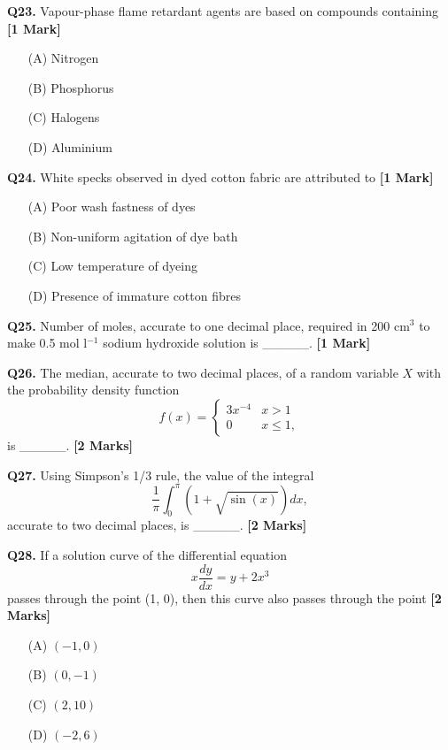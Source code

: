 \documentclass[11pt]{article}
\newcommand{\questiona}[2]{
    \noindent\textbf{Q#2.} #1 \hfill \textbf{[1 Mark]}
}
\newcommand{\questionb}[2]{
    \noindent\textbf{Q#2.} #1 \hfill \textbf{[2 Marks]}
}
\begin{document}
\questiona{Vapour-phase flame retardant agents are based on compounds containing}{23}
\begin{enumerate}
    \item[(A)] Nitrogen  
    \item[(B)] Phosphorus  
    \item[(C)] Halogens  
    \item[(D)] Aluminium  
\end{enumerate}
\vspace{0.5cm}

\questiona{White specks observed in dyed cotton fabric are attributed to}{24}
\begin{enumerate}
    \item[(A)] Poor wash fastness of dyes  
    \item[(B)] Non-uniform agitation of dye bath  
    \item[(C)] Low temperature of dyeing  
    \item[(D)] Presence of immature cotton fibres  
\end{enumerate}
\vspace{0.5cm}

\questiona{Number of moles, accurate to one decimal place, required in 200 cm\(^3\) to make 0.5 mol l\(^{-1}\) sodium hydroxide solution is \_\_\_\_\_.}{25}
\vspace{0.5cm}

\questionb{The median, accurate to two decimal places, of a random variable \( X \) with the probability density function
\[f(x) = 
\begin{cases} 
3x^{-4} & x > 1 \\ 
0 & x \leq 1, 
\end{cases}\]  
is \_\_\_\_\_.}{26}
\vspace{0.5cm}

\questionb{Using Simpson's 1/3 rule, the value of the integral
\[\frac{1}{\pi} \int_0^{\pi} \left( 1 + \sqrt{\sin(x)} \right) dx,\]  
accurate to two decimal places, is \_\_\_\_\_.}{27}
\vspace{0.5cm}

\questionb{If a solution curve of the differential equation
\[x \frac{dy}{dx} = y + 2x^3\]  
passes through the point (1, 0), then this curve also passes through the point}{28}
\begin{enumerate}
    \item[(A)] \((-1, 0)\)  
    \item[(B)] \((0, -1)\)  
    \item[(C)] \((2, 10)\)  
    \item[(D)] \((-2, 6)\)  
\end{enumerate}
\vspace{0.5cm}
\end{document}
